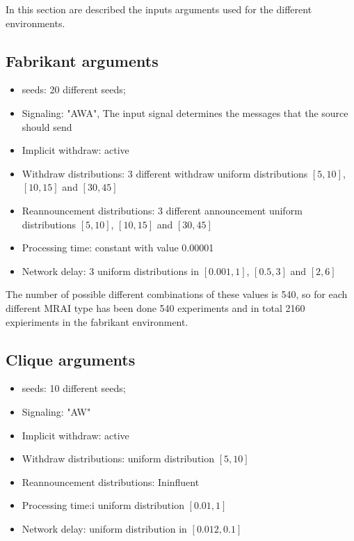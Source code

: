 \documentclass[10pt,conference,letterpaper]{IEEEtran}
\begin{document}
In this section are described the inputs arguments used for the different environments.

\subsection{Fabrikant arguments}
\label{sec:fabrikant_arguments}

\begin{itemize}
	\item seeds: \num{20} different seeds;
	\item Signaling: "AWA", The input signal determines the messages that 
		the source should send
	\item Implicit withdraw: active
	\item Withdraw distributions: \num{3} different withdraw uniform distributions
		$[5, 10]$, $[10, 15]$ and $[30, 45]$
	\item Reannouncement distributions: \num{3} different announcement uniform distributions
		$[5, 10]$, $[10, 15]$ and $[30, 45]$
	\item Processing time: constant with value \num{0.00001}
	\item Network delay: \num{3} uniform distributions in $[0.001, 1]$, $[0.5, 3]$ and $[2, 6]$
\end{itemize} 

The number of possible different combinations of these values is \num{540}, so 
for each different \ac{MRAI} type has been done \num{540} experiments and
in total \num{2160} expieriments in the fabrikant environment.

\subsection{Clique arguments}
\label{subsec:clique_arguments}

\begin{itemize}
	\item seeds: \num{10} different seeds;
	\item Signaling: "AW" 
	\item Implicit withdraw: active
	\item Withdraw distributions: uniform distribution $[5, 10]$
	\item Reannouncement distributions: Ininfluent 
	\item Processing time:i uniform distribution $[0.01, 1]$ 
	\item Network delay: uniform distribution in $[0.012, 0.1]$
\end{itemize} 
\end{document}
